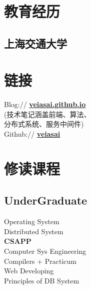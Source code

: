 \documentclass[]{deedy-resume-openfont}
\begin{document}
%
%
\lastupdated

%
%

%
%

\begin{minipage}[t]{0.25\textwidth} 


\section{教育经历} 
\sectionsep

\subsection{上海交通大学}
\sectionsep


\section{链接}
\sectionsep
Blog://  \href{http://veiasai.github.io}{\bf veiasai.github.io} \\
(技术笔记涵盖前端、算法、   \\
分布式系统、服务中间件)     \\    
Github:// \href{https://github.com/veiasai}{\bf veiasai} \\
\sectionsep


\section{修读课程}
\sectionsep
\subsection{UnderGraduate}
Operating System \\
Distributed System \\
\textbf{CSAPP} \\
Computer Sys Engineering \\
Compilers + Practicum \\
Web Developing \\
Principles of DB System  \\
\sectionsep


\end{minipage}
\end{document}
